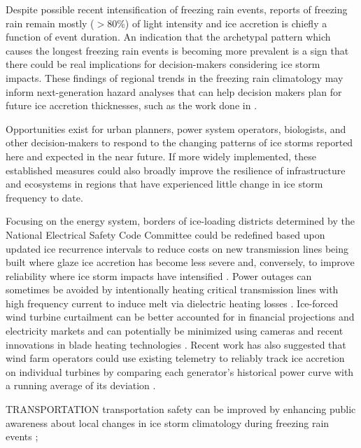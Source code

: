 \documentclass[twocol]{ametsoc}
\begin{document}
Despite possible recent intensification of freezing rain events, reports of freezing rain remain mostly ($>$80\%) of light intensity and ice accretion is chiefly a function of event duration. An indication that the archetypal pattern which causes the longest freezing rain events is becoming more prevalent is a sign that there could be real implications for decision-makers considering ice storm impacts. These findings of regional trends in the freezing rain climatology may inform next-generation hazard analyses that can help decision makers plan for future ice accretion thicknesses, such as the work done in \citet{erfani2014aggregated}.

Opportunities exist for urban planners, power system operators, biologists, and other decision-makers to respond to the changing patterns of ice storms reported here and expected in the near future. If more widely implemented, these established measures could also broadly improve the resilience of infrastructure and ecosystems in regions that have experienced little change in ice storm frequency to date. 

Focusing on the energy system, borders of ice-loading districts determined by the National Electrical Safety Code Committee could be redefined based upon updated ice recurrence intervals to reduce costs on new transmission lines being built where glaze ice accretion has become less severe and, conversely, to improve reliability where ice storm impacts have intensified \citep{american2013minimum}. Power outages can sometimes be avoided by intentionally heating critical transmission lines with high frequency current to induce melt via dielectric heating losses \citep{bendel1981review,huneault2005combined,mccurdy2001using}. Ice-forced wind turbine curtailment can be better accounted for in financial projections and electricity markets and can potentially be minimized using cameras and recent innovations in blade heating technologies \citep{bird2014wind}. Recent work has also suggested that wind farm operators could use existing telemetry to reliably track ice accretion on individual turbines by comparing each generator's historical power curve with a running average of its deviation \citep{davis2016ice}.

TRANSPORTATION 
transportation safety can be improved by enhancing public awareness about local changes in ice storm climatology during freezing rain events \citep{call2009assessment}; 
\end{document}

